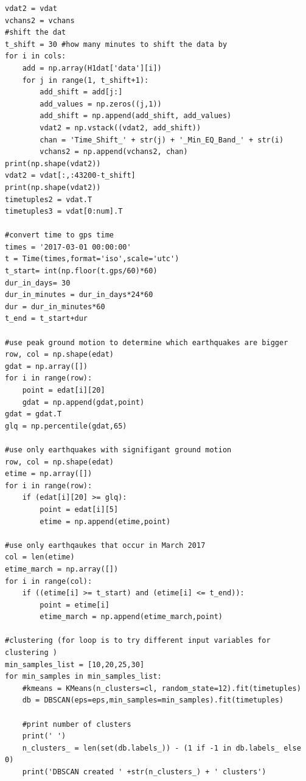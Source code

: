 \documentclass[colorlinks=true,pdfstartview=FitV,linkcolor=blue,
            citecolor=red,urlcolor=magenta]{ligodoc}
\begin{document}
\begin{verbatim}
vdat2 = vdat
vchans2 = vchans
#shift the dat                                                                                                                                             
t_shift = 30 #how many minutes to shift the data by                                                                                                                 
for i in cols:
    add = np.array(H1dat['data'][i])
    for j in range(1, t_shift+1):
        add_shift = add[j:]
        add_values = np.zeros((j,1))
        add_shift = np.append(add_shift, add_values)
        vdat2 = np.vstack((vdat2, add_shift))
        chan = 'Time_Shift_' + str(j) + '_Min_EQ_Band_' + str(i)
        vchans2 = np.append(vchans2, chan)
print(np.shape(vdat2))
vdat2 = vdat[:,:43200-t_shift]
print(np.shape(vdat2))
timetuples2 = vdat.T
timetuples3 = vdat[0:num].T

#convert time to gps time                                                                      
times = '2017-03-01 00:00:00'
t = Time(times,format='iso',scale='utc')
t_start= int(np.floor(t.gps/60)*60)
dur_in_days= 30
dur_in_minutes = dur_in_days*24*60
dur = dur_in_minutes*60
t_end = t_start+dur

#use peak ground motion to determine which earthquakes are bigger
row, col = np.shape(edat)
gdat = np.array([])
for i in range(row):
    point = edat[i][20]
    gdat = np.append(gdat,point)
gdat = gdat.T
glq = np.percentile(gdat,65)

#use only earthquakes with signifigant ground motion                          
row, col = np.shape(edat)
etime = np.array([])
for i in range(row):
    if (edat[i][20] >= glq):
        point = edat[i][5]
        etime = np.append(etime,point)

#use only earthqaukes that occur in March 2017         
col = len(etime)
etime_march = np.array([])
for i in range(col):
    if ((etime[i] >= t_start) and (etime[i] <= t_end)):
        point = etime[i]
        etime_march = np.append(etime_march,point)

#clustering (for loop is to try different input variables for clustering )
min_samples_list = [10,20,25,30]
for min_samples in min_samples_list:
    #kmeans = KMeans(n_clusters=cl, random_state=12).fit(timetuples)
    db = DBSCAN(eps=eps,min_samples=min_samples).fit(timetuples)

    #print number of clusters
    print(' ')
    n_clusters_ = len(set(db.labels_)) - (1 if -1 in db.labels_ else 0)
    print('DBSCAN created ' +str(n_clusters_) + ' clusters')


\end{verbatim}
\end{document}
